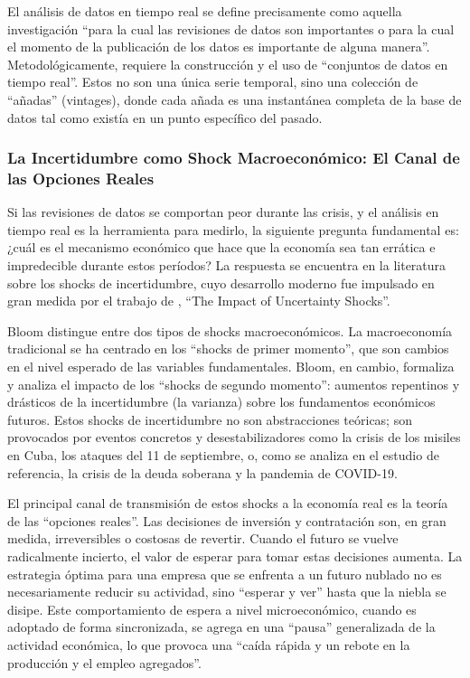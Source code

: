 \documentclass{article}
\begin{document}
El análisis de datos en tiempo real se define precisamente como aquella investigación ``para la cual las revisiones de datos son importantes o para la cual el momento de la publicación de los datos es importante de alguna manera''. Metodológicamente, requiere la construcción y el uso de ``conjuntos de datos en tiempo real''. Estos no son una única serie temporal, sino una colección de ``añadas'' (vintages), donde cada añada es una instantánea completa de la base de datos tal como existía en un punto específico del pasado.

\subsubsection{La Incertidumbre como Shock Macroeconómico: El Canal de las Opciones Reales}

Si las revisiones de datos se comportan peor durante las crisis, y el análisis en tiempo real es la herramienta para medirlo, la siguiente pregunta fundamental es: ¿cuál es el mecanismo económico que hace que la economía sea tan errática e impredecible durante estos períodos? La respuesta se encuentra en la literatura sobre los shocks de incertidumbre, cuyo desarrollo moderno fue impulsado en gran medida por el trabajo de \citet{bloom2009}, ``The Impact of Uncertainty Shocks''.

Bloom distingue entre dos tipos de shocks macroeconómicos. La macroeconomía tradicional se ha centrado en los ``shocks de primer momento'', que son cambios en el nivel esperado de las variables fundamentales. Bloom, en cambio, formaliza y analiza el impacto de los ``shocks de segundo momento'': aumentos repentinos y drásticos de la incertidumbre (la varianza) sobre los fundamentos económicos futuros. Estos shocks de incertidumbre no son abstracciones teóricas; son provocados por eventos concretos y desestabilizadores como la crisis de los misiles en Cuba, los ataques del 11 de septiembre, o, como se analiza en el estudio de referencia, la crisis de la deuda soberana y la pandemia de COVID-19.

El principal canal de transmisión de estos shocks a la economía real es la teoría de las ``opciones reales''. Las decisiones de inversión y contratación son, en gran medida, irreversibles o costosas de revertir. Cuando el futuro se vuelve radicalmente incierto, el valor de esperar para tomar estas decisiones aumenta. La estrategia óptima para una empresa que se enfrenta a un futuro nublado no es necesariamente reducir su actividad, sino ``esperar y ver'' hasta que la niebla se disipe. Este comportamiento de espera a nivel microeconómico, cuando es adoptado de forma sincronizada, se agrega en una ``pausa'' generalizada de la actividad económica, lo que provoca una ``caída rápida y un rebote en la producción y el empleo agregados''.
\end{document}
